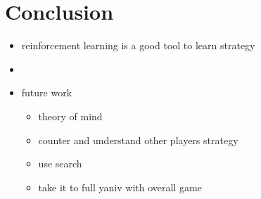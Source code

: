 \documentclass[../main.tex]{subfiles}
\begin{document}
\chapter{Conclusion}
\label{cha:Conclusion}

\begin{itemize}
    \item reinforcement learning is a good tool to learn strategy
    \item
    \item future work
    \begin{itemize}
        \item theory of mind
        \item counter and understand other players strategy
        \item use search
        \item take it to full yaniv with overall game
    \end{itemize}
\end{itemize}
\end{document}
